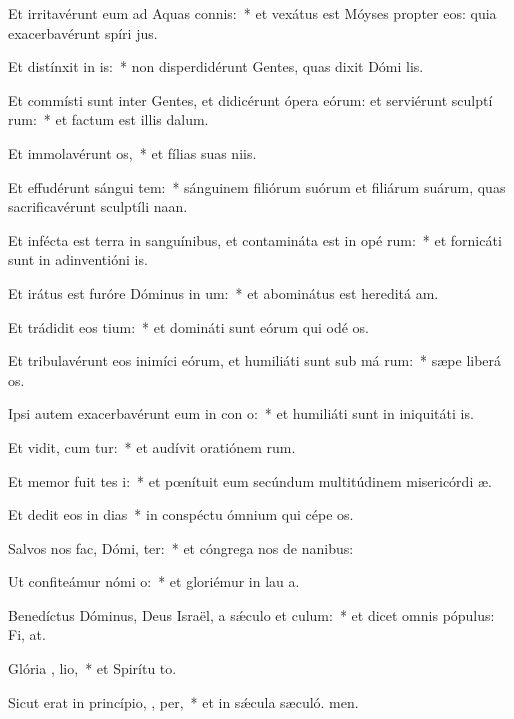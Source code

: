\item Et irritavérunt eum ad Aquas connis:~* et vexátus est Móyses propter eos: quia exacerbavérunt spíri jus.
\item Et distínxit in  is:~* non disperdidérunt Gentes, quas dixit Dómi lis.
\item Et commísti sunt inter Gentes, et didicérunt ópera eórum: et serviérunt sculptí rum:~* et factum est illis  dalum.
\item Et immolavérunt  os,~* et fílias suas niis.
\item Et effudérunt sángui tem:~* sánguinem filiórum suórum et filiárum suárum, quas sacrificavérunt sculptíli naan.
\item Et infécta est terra in sanguínibus, et contamináta est in opé rum:~* et fornicáti sunt in adinventióni is.
\item Et irátus est furóre Dóminus in  um:~* et abominátus est hereditá am.
\item Et trádidit eos   tium:~* et domináti sunt eórum qui odé os.
\item Et tribulavérunt eos inimíci eórum, et humiliáti sunt sub má rum:~* sæpe liberá os.
\item Ipsi autem exacerbavérunt eum in con o:~* et humiliáti sunt in iniquitáti is.
\item Et vidit, cum tur:~* et audívit oratiónem rum.
\item Et memor fuit tes i:~* et pœnítuit eum secúndum multitúdinem misericórdi æ.
\item Et dedit eos in dias~* in conspéctu ómnium qui cépe os.
\item Salvos nos fac, Dómi,  ter:~* et cóngrega nos de nanibus:
\item Ut confiteámur nómi  o:~* et gloriémur in lau a.
\item Benedíctus Dóminus, Deus Israël, a sǽculo et   culum:~* et dicet omnis pópulus: Fi, at.
\item Glória ,  lio,~* et Spirítu to.
\item Sicut erat in princípio,  ,  per,~* et in sǽcula sæculó. men.
